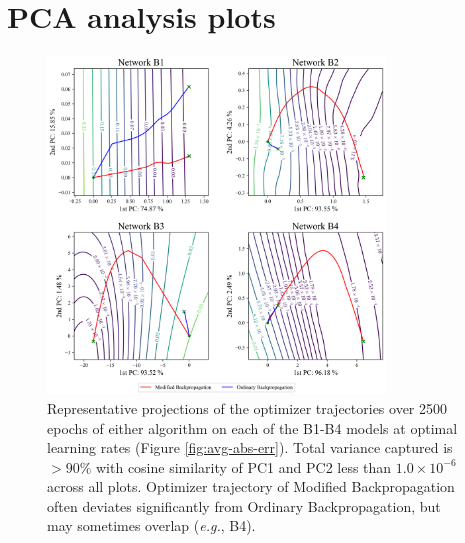 \documentclass{article}
\theoremstyle{plain}
\theoremstyle{definition}
\theoremstyle{remark}
\begin{document}
\section{PCA analysis plots}
\label{app:pca}
\begin{figure}[H]
    \centering
    \includegraphics[width=0.8\textwidth]{./resources/pca_all.png}
    \caption{Representative projections of the optimizer trajectories over 2500 epochs of either algorithm on each of the B1-B4 models at optimal learning rates (Figure \ref{fig:avg-abs-err}). Total variance captured is $>90\%$ with cosine similarity of PC1 and PC2 less than $1.0\times10^{-6}$ across all plots. Optimizer trajectory of Modified Backpropagation often deviates significantly from Ordinary Backpropagation, but may sometimes overlap (\textit{e.g.}, B4).}
    \label{fig:big-pca}
\end{figure}
\end{document}
